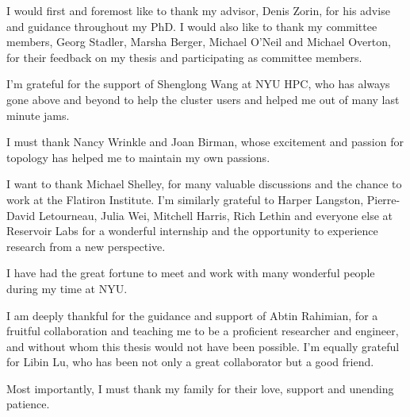 I would first and foremost like to thank my advisor, Denis Zorin, for his advise and guidance throughout my PhD. I would also like to thank my committee members, Georg Stadler, Marsha Berger, Michael O'Neil and Michael Overton, for their feedback on my thesis and participating as committee members.

I'm grateful for the support of Shenglong Wang at NYU HPC, who has always gone above and beyond to help the cluster users and helped me out of many last minute jams.

I must thank Nancy Wrinkle and Joan Birman, whose excitement and passion for topology has helped me to maintain my own passions.

I want to thank Michael Shelley, for many valuable discussions and the chance to work at the Flatiron Institute.
I'm similarly grateful to Harper Langston, Pierre-David Letourneau, Julia Wei, Mitchell Harris, Rich Lethin and everyone else at Reservoir Labs for a wonderful internship and the opportunity to experience research from a new perspective.

I have had the great fortune to meet and work with many wonderful people during my time at NYU.

I am deeply thankful for the guidance and support of Abtin Rahimian, for a fruitful collaboration and teaching me to be a proficient researcher and engineer, and without whom this thesis would not have been possible. 
I'm equally grateful for Libin Lu, who has been not only a great collaborator but a good friend.

Most importantly, I must thank my family for their love, support and unending patience.
